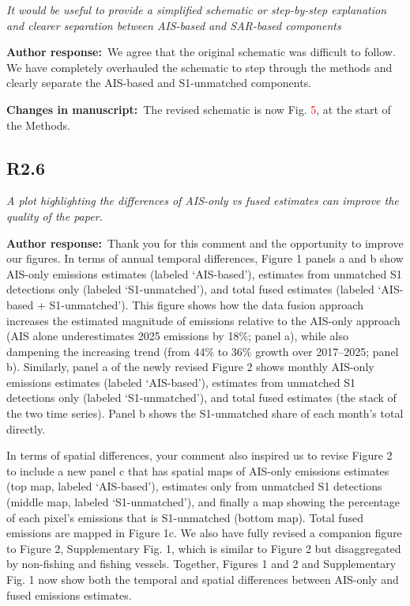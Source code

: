 \documentclass[11pt]{article}
\newcommand{\point}[1]{\subsection*{\normalfont\bfseries #1}}
\newcommand{\response}{\par\medskip\noindent%
  \textbf{\textcolor{respblue}{Author response:}}\ }
\newcommand{\changes}{\par\medskip\noindent%
  \textbf{\textcolor{changegreen}{Changes in manuscript:}}\ }
\begin{document}
\begin{refquote}\itshape
It would be useful to provide a simplified schematic or step-by-step explanation
and clearer separation between AIS-based and SAR-based components
\end{refquote}

\response We agree that the original schematic was difficult to follow. We have completely overhauled the schematic to step through the methods and clearly separate the AIS-based and S1-unmatched components.

\changes The revised schematic is now Fig. \textcolor{red}{5}, at the start of the Methods.

\point{R2.6}

\begin{refquote}\itshape
A plot highlighting the differences of AIS-only vs fused estimates can improve
the quality of the paper.
\end{refquote}

\response Thank you for this comment and the opportunity to improve our figures. In terms of annual temporal differences, Figure 1 panels a and b show AIS-only emissions estimates (labeled `AIS-based'), estimates from unmatched S1 detections only (labeled `S1-unmatched'), and total fused estimates (labeled `AIS-based + S1-unmatched'). This figure shows how the data fusion approach increases the estimated magnitude of emissions relative to the AIS-only approach (AIS alone underestimates 2025 emissions by 18\%; panel a), while also dampening the increasing trend (from 44\% to 36\% growth over 2017--2025; panel b). Similarly, panel a of the newly revised Figure 2 shows monthly AIS-only emissions estimates (labeled `AIS-based'), estimates from unmatched S1 detections only (labeled `S1-unmatched'), and total fused estimates (the stack of the two time series). Panel b shows the S1-unmatched share of each month's total directly.

In terms of spatial differences, your comment also inspired us to revise Figure 2 to include a new panel c that has spatial maps of AIS-only emissions estimates (top map, labeled `AIS-based'), estimates only from unmatched S1 detections (middle map, labeled `S1-unmatched'), and finally a map showing the percentage of each pixel's emissions that is S1-unmatched (bottom map). Total fused emissions are mapped in Figure 1c. We also have fully revised a companion figure to Figure 2, Supplementary Fig. 1, which is similar to Figure 2 but disaggregated by non-fishing and fishing vessels. Together, Figures 1 and 2 and Supplementary Fig. 1 now show both the temporal and spatial differences between AIS-only and fused emissions estimates.
\end{document}
